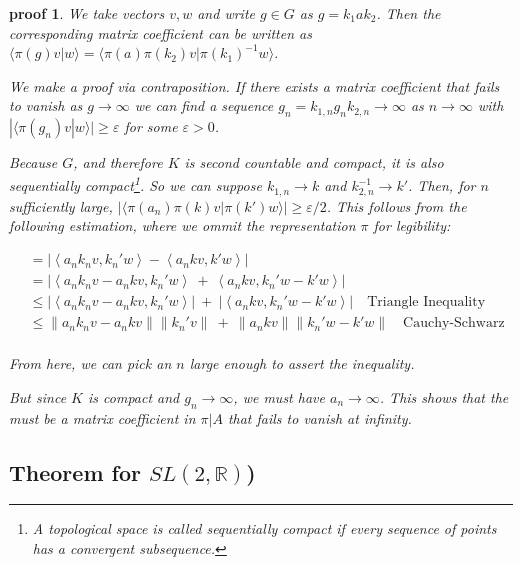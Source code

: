 \documentclass[
  12pt
]{article}
\theoremstyle{break}
\theoremstyle{plain}
\newtheorem*{pf}{proof}
\newcommand{\abs}[1]{| #1 |}
\newcommand{\inn}[1]{\left\langle #1 \right\rangle}
\newcommand{\norm}[1]{\lVert #1 \rVert}
\begin{document}
  \begin{pf}
    \label{pf:lemma}
    We take vectors $v, w$ and write $g \in G$ as $g = k_1 a k_2$.
    Then the corresponding matrix
    coefficient can be written as $\langle \pi(g)v|w \rangle = \langle \pi(a) \pi(k_2) v | \pi(k_1)^{-1} w \rangle$.

    We make a proof via contraposition.
    If there exists a matrix coefficient that fails to vanish as $g \rightarrow \infty$
    we can find a sequence $g_n = k_{1,n} g_{n} k_{2,n} \rightarrow \infty$ as
    $n \rightarrow \infty$ with
    $|\langle \pi(g_n) v | w \rangle | \geq \varepsilon$ for some $\varepsilon > 0$.

    Because $G$, and therefore $K$ is second countable and compact, it is also sequentially compact\footnote{A topological space is called \emph{sequentially compact} if every sequence of points has a convergent subsequence.}.
    So we can suppose $k_{1,n} \rightarrow k$ and $k_{2,n}^{-1} \rightarrow k'$.
    Then, for $n$ sufficiently large, $|\langle \pi(a_n)\pi(k)v | \pi(k') w \rangle | \geq \varepsilon/2$.
    This follows from the following estimation, where we ommit the representation $\pi$ for legibility:

    \begin{align*}
        &=\abs{\inn{a_n k_n v, k_n' w} - \inn{a_n k v, k' w}} \\
        &= \abs{\inn{a_nk_nv - a_nkv, k_n'w} \ + \ \inn{a_nkv, k_n'w - k'w}}  \\
        &\leq \abs{\inn{a_nk_nv - a_nkv, k_n'w}} \ + \ \abs{\inn{a_nkv, k_n'w - k'w}} \quad \text{Triangle Inequality} \\
        &\leq \norm{a_nk_nv - a_nkv}\norm{k_n'v} \ + \ \norm{a_nkv}\norm{k_n'w - k'w} \quad \text{Cauchy-Schwarz} \\
     \end{align*}

    From here, we can pick an $n$ large enough to assert the inequality.

    But since $K$ is compact and $g_n \rightarrow \infty$, we must have
    $a_n \rightarrow \infty$. This shows that the must be a matrix
    coefficient in $\pi | A$ that fails to vanish at infinity.
  \end{pf}

  \hypertarget{theorem-for-sl2-r}{%
  \subsection{Theorem for \texorpdfstring{$SL(2, \mathbb{R})$}{SN(2, R)})}\label{theorem-for-sl2-r}}
\end{document}

